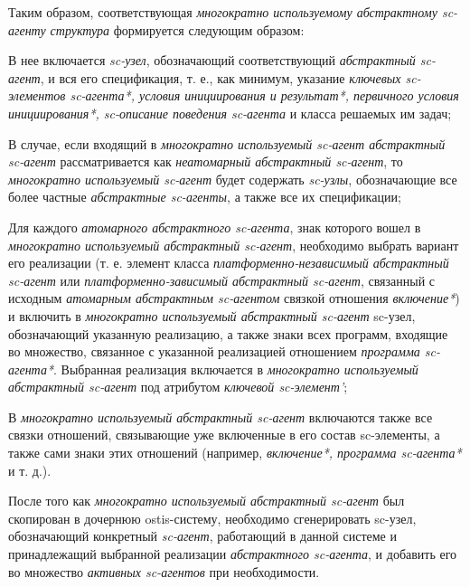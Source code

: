Таким образом, соответствующая \textit{многократно используемому абстрактному sc-агенту структура} формируется следующим образом:

\begin{textitemize}
    \item В нее включается \textit{sc-узел}, обозначающий соответствующий \textit{абстрактный sc-агент}, и вся его спецификация, т. е., как минимум, указание \textit{ключевых sc-элементов sc-агента*, условия инициирования и результат*, первичного условия инициирования*, sc-описание поведения sc-агента} и класса решаемых им задач;
    \item В случае, если входящий в \textit{многократно используемый sc-агент абстрактный sc-агент} рассматривается как \textit{неатомарный абстрактный sc-агент}, то \textit{многократно используемый sc-агент} будет содержать \textit{sc-узлы}, обозначающие все более частные \textit{абстрактные sc-агенты}, а также все их спецификации;
    \item Для каждого \textit{атомарного абстрактного sc-агента}, знак которого вошел в \textit{многократно используемый абстрактный sc-агент}, необходимо выбрать вариант его реализации (т. е. элемент класса \textit{платформенно-независимый абстрактный sc-агент} или \textit{платформенно-зависимый абстрактный sc-агент}, связанный с исходным \textit{атомарным абстрактным sc-агентом} связкой отношения \textit{включение*}) и включить в \textit{многократно используемый абстрактный sc-агент} sc-узел, обозначающий указанную реализацию, а также знаки всех программ, входящие во множество, связанное с указанной реализацией отношением \textit{программа sc-агента*}. Выбранная реализация включается в \textit{многократно используемый абстрактный sc-агент} под атрибутом \textit{ключевой sc-элемент'};
    \item В \textit{многократно используемый абстрактный sc-агент} включаются также все связки отношений, связывающие уже включенные в его состав sc-элементы, а также сами знаки этих отношений (например, \textit{включение*, программа sc-агента*} и т. д.).
\end{textitemize}

После того как \textit{многократно используемый абстрактный sc-агент} был скопирован в дочернюю ostis-систему, необходимо сгенерировать sc-узел, обозначающий конкретный \textit{sc-агент}, работающий в данной системе и принадлежащий выбранной реализации \textit{абстрактного sc-агента}, и добавить его во множество \textit{активных sc-агентов} при необходимости.


